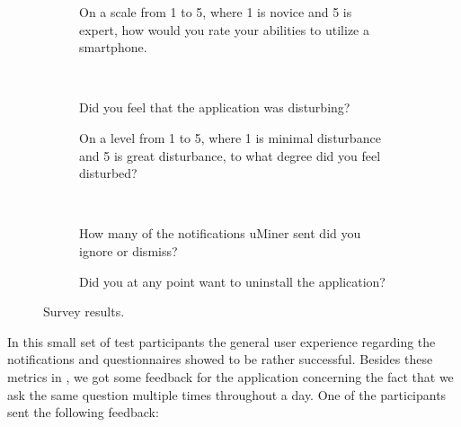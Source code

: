 \begin{figure}[!htbp]
    \begin{subfigure}[!t]{.45\textwidth}
      \centering
        
        \caption{On a scale from 1 to 5, where 1 is novice and 5 is expert, how would you rate your abilities to utilize a smartphone.}
      \label{fig:smartphone_ability}
    \end{subfigure}
    ~
    \begin{subfigure}[!htbp]{.45\textwidth}
      \centering
        
      \caption{Did you feel that the application was disturbing?}
      \label{fig:general_disturbance}
    \end{subfigure}
    \vspace{1em}
    \begin{subfigure}[!htbp]{.45\textwidth}
      \centering
        
      \caption{On a level from 1 to 5, where 1 is minimal disturbance and 5 is great disturbance, to what degree did you feel disturbed?}
      \label{fig:disturbance_level}
    \end{subfigure}
    ~
    \begin{subfigure}[!htbp]{.45\textwidth}
      \centering
        
      \caption{How many of the notifications uMiner sent did you ignore or dismiss?}
      \label{fig:ingore_notifications}
    \end{subfigure}
    \vspace{1em}
    \begin{subfigure}[!htbp]{\textwidth}
      \centering
        
      \caption{Did you at any point want to uninstall the application?}
      \label{fig:want_to_uninstall}
    \end{subfigure}
    \caption{Survey results.}
    \label{fig:survey_results}
    \end{figure}
\FloatBarrier

In this small set of test participants the general user experience regarding the notifications and questionnaires showed to be rather successful. Besides these metrics in , we got some feedback for the application concerning the fact that we ask the same question multiple times throughout a day. One of the participants sent the following feedback:

